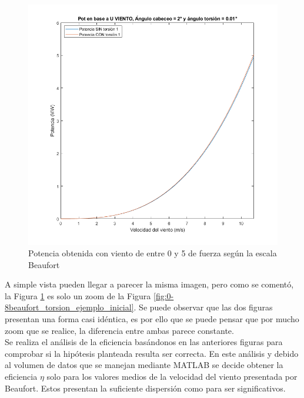 \begin{figure}[H]
    \centering
    \includegraphics[width=1\textwidth]{images/0-5beau torsion.png}
    \caption{Potencia obtenida con viento de entre 0 y 5 de fuerza según la escala Beaufort}
     \label{fig:0-5beaufort_torsion_ejemplo_inicial}
\end{figure}

A simple vista pueden llegar a parecer la misma imagen, pero como se comentó, la Figura \ref{fig:0-5beaufort_torsion_ejemplo_inicial} es solo un zoom de la Figura \ref{fig:0-8beaufort_torsion_ejemplo_inicial}. Se puede observar que las dos figuras presentan una forma casi idéntica, es por ello que se puede pensar que por mucho zoom que se realice, la diferencia entre ambas parece constante.\\

Se realiza el análisis de la eficiencia basándonos en las anteriores figuras para comprobar si la hipótesis planteada resulta ser correcta. En este análisis y debido al volumen de datos que se manejan mediante MATLAB se decide obtener la eficiencia $\eta$ solo para los valores medios de la velocidad del viento presentada por Beaufort. Estos presentan la suficiente dispersión como para ser significativos.

